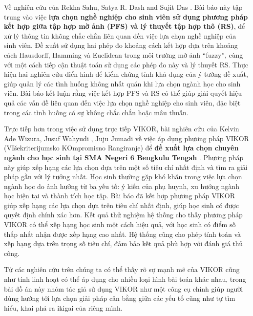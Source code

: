 Về nghiên cứu của Rekha Sahu, Satya R. Dash and Sujit Das \cite{rekha}. Bài báo này tập trung vào việc \textbf{lựa chọn nghề nghiệp cho sinh viên sử dụng phương pháp kết hợp giữa tập hợp mờ ảnh (PFS) và lý thuyết tập hợp thô (RS)}, để xử lý thông tin không chắc chắn liên quan đến việc lựa chọn nghề nghiệp của sinh viên. Đề xuất sử dụng hai phép đo khoảng cách kết hợp dựa trên khoảng cách Hausdorff, Hamming và Euclidean trong môi trường mờ ảnh “fuzzy”, cùng với một cách tiếp cận thuật toán sử dụng các phép đo này và lý thuyết RS. Thực hiện hai nghiên cứu điển hình để kiểm chứng tính khả dụng của ý tưởng đề xuất, giúp quản lý các tình huống không nhất quán khi lựa chọn ngành học cho sinh viên. Bài báo kết luận rằng việc kết hợp PFS và RS có thể giúp giải quyết hiệu quả các vấn đề liên quan đến việc lựa chọn nghề nghiệp cho sinh viên, đặc biệt trong các tình huống có sự không chắc chắn hoặc mâu thuẫn.

Trực tiếp hơn trong việc sử dụng trực tiếp VIKOR, bài nghiên cứu của Kelvin Ade Wizura, Jusuf Wahyudi , Juju Jumadi về việc áp dụng phương pháp VIKOR (VIšekriterijumsko KOmpromisno Rangiranje) để \textbf{đề xuất lựa chọn chuyên ngành cho học sinh tại SMA Negeri 6 Bengkulu Tengah} \cite{kelvin}. Phương pháp này giúp xếp hạng các lựa chọn dựa trên một số tiêu chí nhất định và tìm ra giải pháp gần với lý tưởng nhất. Học sinh thường gặp khó khăn trong việc lựa chọn ngành học do ảnh hưởng từ ba yếu tố: ý kiến của phụ huynh, xu hướng ngành học hiện tại và thành tích học tập. Bài báo đã kết hợp phương pháp VIKOR giúp xếp hạng các lựa chọn dựa trên tiêu chí nhất định, giúp học sinh có được quyết định chính xác hơn. Kết quả thử nghiệm hệ thống cho thấy phương pháp VIKOR có thể xếp hạng học sinh một cách hiệu quả, với học sinh có điểm số thấp nhất nhận được xếp hạng cao nhất. Hệ thống cũng cho phép tính toán và xếp hạng dựa trên trọng số tiêu chí, đảm bảo kết quả phù hợp với đánh giá thủ công.

Từ các nghiên cứu trên chúng ta có thể thấy rõ sự mạnh mẽ của VIKOR cũng như tính linh hoạt có thể áp dụng cho nhiều loại hình bài toán khác nhau, trong bài đồ án này nhóm tác giả sử dụng VIKOR như một công cụ chính giúp người dùng hướng tới lựa chọn giải pháp cân bằng giữa các yếu tố cũng như tự tìm hiểu, khai phá ra ikigai của riêng mình.

